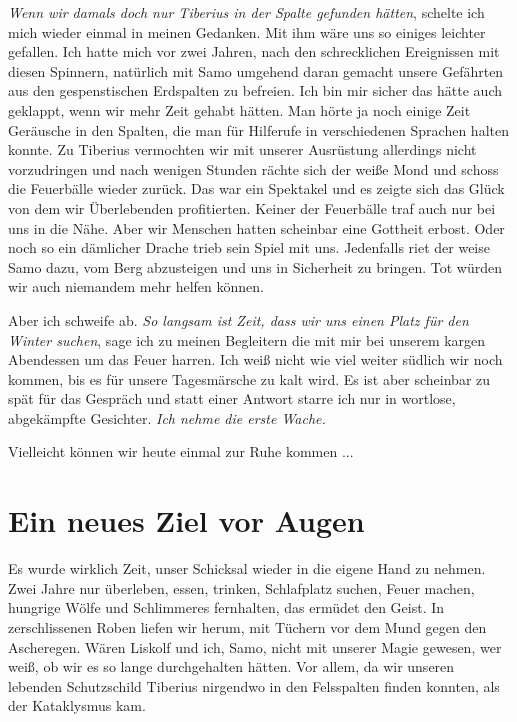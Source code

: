 \documentclass[11pt]{wbzine}
\begin{document}
\begin{multicols}{2}
\textit{Wenn wir damals doch nur Tiberius in der Spalte gefunden
hätten}, schelte ich mich wieder einmal in meinen Gedanken. Mit ihm
wäre uns so einiges leichter gefallen. Ich hatte mich vor zwei
Jahren, nach den schrecklichen Ereignissen mit diesen Spinnern,
natürlich mit Samo umgehend daran gemacht unsere Gefährten
aus den gespenstischen Erdspalten zu befreien. Ich bin mir sicher
das hätte auch geklappt, wenn wir mehr Zeit gehabt hätten. Man hörte
ja noch einige Zeit Geräusche in den Spalten, die man für Hilferufe
in verschiedenen Sprachen halten konnte. Zu Tiberius vermochten wir 
mit unserer Ausrüstung allerdings nicht vorzudringen und 
nach wenigen Stunden rächte sich der weiße Mond und schoss die
Feuerbälle wieder zurück. Das war ein Spektakel und es zeigte sich
das Glück von dem wir Überlebenden profitierten. Keiner der
Feuerbälle traf auch nur bei uns in die Nähe. Aber wir Menschen
hatten scheinbar eine Gottheit erbost. Oder noch so ein dämlicher
Drache trieb sein Spiel mit uns. Jedenfalls riet der weise Samo
dazu, vom Berg abzusteigen und uns in Sicherheit zu bringen. 
Tot würden wir auch niemandem mehr helfen können.


Aber ich schweife ab. \textit{So langsam ist Zeit, dass wir uns einen
Platz für den Winter suchen}, sage ich zu meinen Begleitern die mit
mir bei unserem kargen Abendessen um das Feuer harren. Ich weiß
nicht wie viel weiter südlich wir noch kommen, bis es für unsere
Tagesmärsche zu kalt wird. Es ist aber scheinbar zu spät für das
Gespräch und statt einer Antwort starre ich nur in wortlose,
abgekämpfte Gesichter. \textit{Ich nehme die erste Wache.} 

Vielleicht können wir heute einmal zur Ruhe kommen ...

\section{Ein neues Ziel vor Augen}

Es wurde wirklich Zeit, unser Schicksal wieder in die eigene Hand zu
nehmen. Zwei Jahre nur überleben, essen, trinken, Schlafplatz
suchen, Feuer machen, hungrige Wölfe und Schlimmeres fernhalten, das
ermüdet den Geist. In zerschlissenen Roben liefen wir herum, mit
Tüchern vor dem Mund gegen den Ascheregen. Wären Liskolf und ich,
Samo, nicht mit unserer Magie gewesen, wer weiß, ob wir es so lange
durchgehalten hätten. Vor allem, da wir unseren lebenden
Schutzschild Tiberius nirgendwo in den Felsspalten finden konnten,
als der Kataklysmus kam.


\end{multicols}
\end{document}
